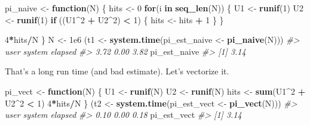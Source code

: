 \documentclass[]{book}
\newenvironment{Shaded}{\begin{snugshade}}{\end{snugshade}}
\newcommand{\KeywordTok}[1]{\textcolor[rgb]{0.13,0.29,0.53}{\textbf{#1}}}
\newcommand{\DecValTok}[1]{\textcolor[rgb]{0.00,0.00,0.81}{#1}}
\newcommand{\FloatTok}[1]{\textcolor[rgb]{0.00,0.00,0.81}{#1}}
\newcommand{\StringTok}[1]{\textcolor[rgb]{0.31,0.60,0.02}{#1}}
\newcommand{\CommentTok}[1]{\textcolor[rgb]{0.56,0.35,0.01}{\textit{#1}}}
\newcommand{\ControlFlowTok}[1]{\textcolor[rgb]{0.13,0.29,0.53}{\textbf{#1}}}
\newcommand{\OperatorTok}[1]{\textcolor[rgb]{0.81,0.36,0.00}{\textbf{#1}}}
\newcommand{\NormalTok}[1]{#1}
\begin{document}
\begin{Shaded}
\begin{Highlighting}[]
\NormalTok{pi_naive <-}\StringTok{ }\ControlFlowTok{function}\NormalTok{(N) \{}
\NormalTok{  hits <-}\StringTok{ }\DecValTok{0}
  \ControlFlowTok{for}\NormalTok{(i }\ControlFlowTok{in} \KeywordTok{seq_len}\NormalTok{(N)) \{}
\NormalTok{    U1 <-}\StringTok{ }\KeywordTok{runif}\NormalTok{(}\DecValTok{1}\NormalTok{)}
\NormalTok{    U2 <-}\StringTok{ }\KeywordTok{runif}\NormalTok{(}\DecValTok{1}\NormalTok{)}
    \ControlFlowTok{if}\NormalTok{ ((U1}\OperatorTok{^}\DecValTok{2} \OperatorTok{+}\StringTok{ }\NormalTok{U2}\OperatorTok{^}\DecValTok{2}\NormalTok{) }\OperatorTok{<}\StringTok{ }\DecValTok{1}\NormalTok{) \{}
\NormalTok{      hits <-}\StringTok{ }\NormalTok{hits }\OperatorTok{+}\StringTok{ }\DecValTok{1}
\NormalTok{    \}}
\NormalTok{  \}}
  
  \DecValTok{4}\OperatorTok{*}\NormalTok{hits}\OperatorTok{/}\NormalTok{N}
\NormalTok{\}}
\NormalTok{N <-}\StringTok{ }\FloatTok{1e6}
\NormalTok{(t1 <-}\StringTok{ }\KeywordTok{system.time}\NormalTok{(pi_est_naive <-}\StringTok{ }\KeywordTok{pi_naive}\NormalTok{(N)))}
\CommentTok{#>    user  system elapsed }
\CommentTok{#>    3.72    0.00    3.82}
\NormalTok{pi_est_naive}
\CommentTok{#> [1] 3.14}
\end{Highlighting}
\end{Shaded}

That's a long run time (and bad estimate). Let's vectorize it.

\begin{Shaded}
\begin{Highlighting}[]
\NormalTok{pi_vect <-}\StringTok{ }\ControlFlowTok{function}\NormalTok{(N) \{}
\NormalTok{  U1 <-}\StringTok{ }\KeywordTok{runif}\NormalTok{(N)}
\NormalTok{  U2 <-}\StringTok{ }\KeywordTok{runif}\NormalTok{(N)}
\NormalTok{  hits <-}\StringTok{ }\KeywordTok{sum}\NormalTok{(U1}\OperatorTok{^}\DecValTok{2} \OperatorTok{+}\StringTok{ }\NormalTok{U2}\OperatorTok{^}\DecValTok{2} \OperatorTok{<}\StringTok{ }\DecValTok{1}\NormalTok{)}
  \DecValTok{4}\OperatorTok{*}\NormalTok{hits}\OperatorTok{/}\NormalTok{N}
\NormalTok{\}}
\NormalTok{(t2 <-}\StringTok{ }\KeywordTok{system.time}\NormalTok{(pi_est_vect <-}\StringTok{ }\KeywordTok{pi_vect}\NormalTok{(N)))}
\CommentTok{#>    user  system elapsed }
\CommentTok{#>    0.10    0.00    0.18}
\NormalTok{pi_est_vect}
\CommentTok{#> [1] 3.14}
\end{Highlighting}
\end{Shaded}
\end{document}
